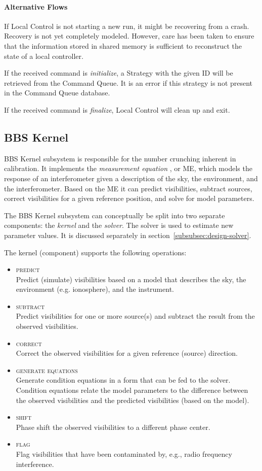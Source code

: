 \documentclass[10pt]{lofar}
\newcommand{\predict}{\textsc{predict}\xspace}
\newcommand{\subtract}{\textsc{subtract}\xspace}
\newcommand{\correct}{\textsc{correct}\xspace}
\newcommand{\generate}{\textsc{generate equations}\xspace}
\newcommand{\shift}{\textsc{shift}\xspace}
\newcommand{\flag}{\textsc{flag}\xspace}
\begin{document}
\paragraph*{Alternative Flows}
If Local Control is not starting a new run, it might be recovering from a
crash. Recovery is not yet completely modeled. However, care has been taken
to ensure that the information stored in shared memory is sufficient to
reconstruct the state of a local controller.

If the received command is \textit{initialize}, a Strategy with the given ID
will be retrieved from the Command Queue. It is an error if this strategy is not
present in the Command Queue database.

If the received command is \textit{finalize}, Local Control will clean up and
exit.

\subsection{BBS Kernel}
\label{subsec:design-kernel}

BBS Kernel subsystem is responsible for the number crunching inherent in
calibration. It implements the \emph{measurement equation} \cite{Hamaker1996-1,
aips++note185}, or ME, which models the response of an interferometer given a
description of the sky, the environment, and the interferometer. Based on the
ME it can predict visibilities, subtract sources, correct visibilities for a
given reference position, and solve for model parameters.

The BBS Kernel subsystem can conceptually be split into two separate components:
the \emph{kernel} and the \emph{solver}. The solver is used to estimate new
parameter values. It is discussed separately in
section~\ref{subsubsec:design-solver}.

The kernel (component) supports the following operations:

\begin{itemize}
\item \predict\\
Predict (simulate) visibilities based on a model that describes the sky, the
environment (e.g. ionosphere), and the instrument.
\item \subtract\\
Predict visibilities for one or more source(s) and subtract the result from the
observed visibilities.
\item \correct\\
Correct the observed visibilities for a given reference (source) direction.
\item \generate\\
Generate condition equations in a form that can be fed to the solver. Condition
equations relate the model parameters to the difference between the observed
visibilities and the predicted visibilities (based on the model).
\item \shift\\
Phase shift the observed visibilities to a different phase center.
\item \flag\\
Flag visibilities that have been contaminated by, e.g., radio frequency interference.
\end{itemize}
\end{document}
